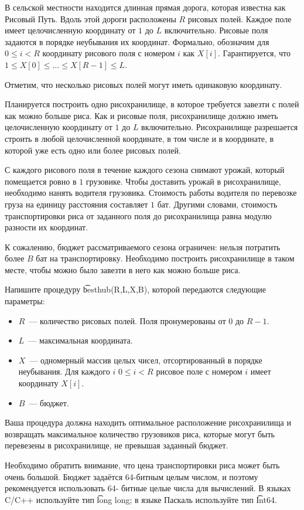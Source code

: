 В сельской местности находится длинная прямая дорога, которая известна как Рисовый Путь. Вдоль этой дороги расположены $R$ рисовых полей. Каждое поле имеет целочисленную координату от $1$ до $L$ включительно. Рисовые поля задаются в порядке неубывания их координат. Формально, обозначим для $0 \le i < R$ координату рисового поля с номером $i$ как $X[i]$. Гарантируется, что $1 \le X[0] \le \ldots \le X[R-1] \le L$.

Отметим, что несколько рисовых полей могут иметь одинаковую координату.

Планируется построить одно рисохранилище, в которое требуется завезти с полей как можно больше риса. Как и рисовые поля, рисохранилище должно иметь целочисленную координату от $1$ до $L$ включительно. Рисохранилище разрешается строить в любой целочисленной координате, в том числе и в координате, в которой уже есть одно или более рисовых полей.

С каждого рисового поля в течение каждого сезона снимают урожай, который помещается ровно в $1$ грузовике. Чтобы доставить урожай в рисохранилище, необходимо нанять водителя грузовика. Стоимость работы водителя по перевозке груза на единицу расстояния составляет $1$ бат. Другими словами, стоимость транспортировки риса от заданного поля до рисохранилища равна модулю разности их координат.

К сожалению, бюджет рассматриваемого сезона ограничен: нельзя потратить более $B$ бат на транспортировку. Необходимо построить рисохранилище в таком месте, чтобы можно было завезти в него как можно больше риса.

Напишите процедуру \t{besthub(R,L,X,B)}, которой передаются следующие параметры:

\begin{itemize}
\item $R$~--- количество рисовых полей. Поля пронумерованы от $0$ до $R-1$.
\item $L$~--- максимальная координата.
\item $X$~--- одномерный массив целых чисел, отсортированный в порядке неубывания. Для каждого $i$ $0 \le i < R$ рисовое поле с номером $i$ имеет координату $X[i]$.
\item $B$~--- бюджет.
\end{itemize}

Ваша процедура должна находить оптимальное расположение рисохранилища и возвращать максимальное количество грузовиков риса, которые могут быть перевезены в рисохранилище, не превышая заданный бюджет.

Необходимо обратить внимание, что цена транспортировки риса может быть очень большой. Бюджет задаётся 64-битным целым числом, и поэтому рекомендуется использовать 64- битные целые числа для вычислений. В языках C/C++ используйте тип \t{long long}; в языке Паскаль используйте тип \t{Int64}.
